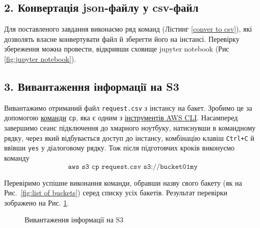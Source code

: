 \documentclass[a4paper,14pt]{extarticle} %
\begin{document}
\subsection*{2. Конвертація json-файлу у csv-файл}

Для поставленого завдання виконаємо ряд команд (Лістинг \ref{conver to csv}), які дозволять власне конвертувати 
файл й зберегти його на інстансі. Перевірку збереження можна провести, відкривши сховище jupyter notebook 
(Рис \ref{fig:jupyter notebook}).



\subsection*{3. Вивантаження інформації на S3}
\label{section 5}

Вивантажимо отриманий файл \texttt{request.csv} з інстансу на бакет. Зробимо це за допомогою 
\href{https://awscli.amazonaws.com/v2/documentation/api/latest/reference/s3/cp.html}{команди} \texttt{cp}, 
яка є одним з 
\href{https://awscli.amazonaws.com/v2/documentation/api/latest/reference/s3/index.html}{інструментів AWS CLI}.
Насамперед завершимо сеанс підключення до хмарного ноутбуку, натиснувши в командному рядку, через який 
відбувається доступ до інстансу, комбінацію клавіш \texttt{Ctrl+C} й ввівши \texttt{yes} у діалоговому 
рядку. Тож після підготовчих кроків виконуємо команду 
\[ \texttt{aws s3 cp request.csv s3://bucket01my} \]

Перевіримо успішне виконання команди, обравши назву свого бакету (як на Рис.~\ref{fig:list of buckets}) серед 
списку усіх бакетів. Результат перевірки зображено на Рис. \ref{fig:svg on S3}.

\begin{figure}[H]
    \caption{Вивантаження інформації на S3}
    \label{fig:svg on S3}
\end{figure}
\end{document}
